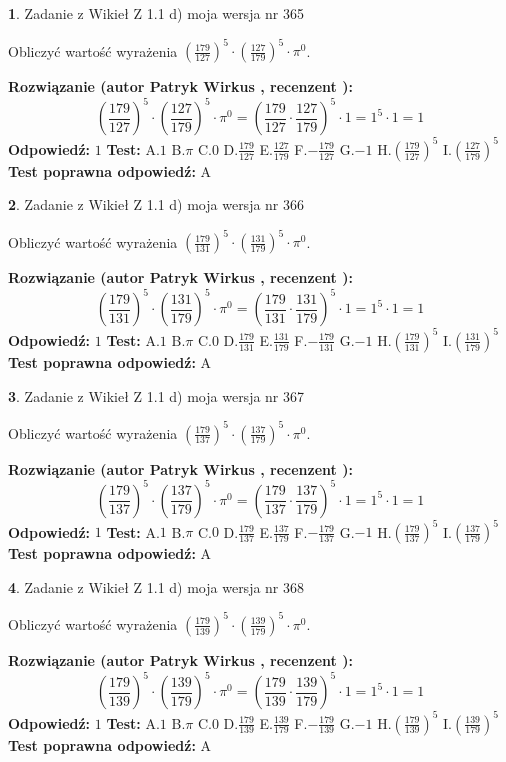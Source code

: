 \documentclass[12pt, a4paper]{article}
\theoremstyle{definition} %
\newtheorem{zad}{}
\newcommand{\zadStart}[1]{\begin{zad}#1\newline}
\newcommand{\zadStop}{\end{zad}}
\newcommand{\rozwStart}[2]{\noindent \textbf{Rozwiązanie (autor #1 , recenzent #2): }\newline}
\newcommand{\rozwStop}{\newline}
\newcommand{\odpStart}{\noindent \textbf{Odpowiedź:}\newline}
\newcommand{\odpStop}{\newline}
\newcommand{\testStart}{\noindent \textbf{Test:}\newline}
\newcommand{\testStop}{\newline}
\newcommand{\kluczStart}{\noindent \textbf{Test poprawna odpowiedź:}\newline}
\newcommand{\kluczStop}{\newline}
\begin{document}
\zadStart{Zadanie z Wikieł Z 1.1 d) moja wersja nr 365}

Obliczyć wartość wyrażenia $(\frac{179}{127})^{5} \cdot (\frac{127}{179})^{5} \cdot \pi^{0}$.
\zadStop
\rozwStart{Patryk Wirkus}{}
$$(\frac{179}{127})^{5} \cdot (\frac{127}{179})^{5} \cdot \pi^{0} = (\frac{179}{127} \cdot \frac{127}{179})^{5} \cdot 1 = 1^{5} \cdot 1 = 1$$
\rozwStop
\odpStart
$1$
\odpStop
\testStart
A.$1$ B.$\pi$ C.$0$ D.$\frac{179}{127}$ E.$\frac{127}{179}$
F.$-\frac{179}{127}$ G.$-1$
H.$(\frac{179}{127})^{5}$
I.$(\frac{127}{179})^{5}$
\testStop
\kluczStart
A
\kluczStop



\zadStart{Zadanie z Wikieł Z 1.1 d) moja wersja nr 366}

Obliczyć wartość wyrażenia $(\frac{179}{131})^{5} \cdot (\frac{131}{179})^{5} \cdot \pi^{0}$.
\zadStop
\rozwStart{Patryk Wirkus}{}
$$(\frac{179}{131})^{5} \cdot (\frac{131}{179})^{5} \cdot \pi^{0} = (\frac{179}{131} \cdot \frac{131}{179})^{5} \cdot 1 = 1^{5} \cdot 1 = 1$$
\rozwStop
\odpStart
$1$
\odpStop
\testStart
A.$1$ B.$\pi$ C.$0$ D.$\frac{179}{131}$ E.$\frac{131}{179}$
F.$-\frac{179}{131}$ G.$-1$
H.$(\frac{179}{131})^{5}$
I.$(\frac{131}{179})^{5}$
\testStop
\kluczStart
A
\kluczStop



\zadStart{Zadanie z Wikieł Z 1.1 d) moja wersja nr 367}

Obliczyć wartość wyrażenia $(\frac{179}{137})^{5} \cdot (\frac{137}{179})^{5} \cdot \pi^{0}$.
\zadStop
\rozwStart{Patryk Wirkus}{}
$$(\frac{179}{137})^{5} \cdot (\frac{137}{179})^{5} \cdot \pi^{0} = (\frac{179}{137} \cdot \frac{137}{179})^{5} \cdot 1 = 1^{5} \cdot 1 = 1$$
\rozwStop
\odpStart
$1$
\odpStop
\testStart
A.$1$ B.$\pi$ C.$0$ D.$\frac{179}{137}$ E.$\frac{137}{179}$
F.$-\frac{179}{137}$ G.$-1$
H.$(\frac{179}{137})^{5}$
I.$(\frac{137}{179})^{5}$
\testStop
\kluczStart
A
\kluczStop



\zadStart{Zadanie z Wikieł Z 1.1 d) moja wersja nr 368}

Obliczyć wartość wyrażenia $(\frac{179}{139})^{5} \cdot (\frac{139}{179})^{5} \cdot \pi^{0}$.
\zadStop
\rozwStart{Patryk Wirkus}{}
$$(\frac{179}{139})^{5} \cdot (\frac{139}{179})^{5} \cdot \pi^{0} = (\frac{179}{139} \cdot \frac{139}{179})^{5} \cdot 1 = 1^{5} \cdot 1 = 1$$
\rozwStop
\odpStart
$1$
\odpStop
\testStart
A.$1$ B.$\pi$ C.$0$ D.$\frac{179}{139}$ E.$\frac{139}{179}$
F.$-\frac{179}{139}$ G.$-1$
H.$(\frac{179}{139})^{5}$
I.$(\frac{139}{179})^{5}$
\testStop
\kluczStart
A
\kluczStop
\end{document}
